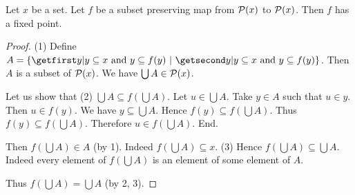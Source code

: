 \documentclass[../set-theory.tex]{subfiles}
\begin{document}
  \begin{forthel}
    \begin{theorem}
      Let $x$ be a set.
      Let $f$ be a subset preserving map from $\mathcal{P}(x)$ to $\mathcal{P}(x)$.
      Then $f$ has a fixed point.
    \end{theorem}
    \begin{proof}
      (1) Define $A = \class{y | \text{$y \subseteq x$ and
      $y \subseteq f(y)$}}$.
      Then $A$ is a subset of $\mathcal{P}(x)$.
      We have $\bigcup A \in \mathcal{P}(x)$.

      Let us show that (2) $\bigcup A \subseteq f(\bigcup A)$.
        Let $u \in \bigcup A$.
        Take $y \in A$ such that $u \in y$.
        Then $u \in f(y)$.
        We have $y \subseteq \bigcup A$.
        Hence $f(y) \subseteq f(\bigcup A)$.
        Thus $f(y) \subseteq f(\bigcup A)$.
        Therefore $u \in f(\bigcup A)$.
      End.

      Then $f(\bigcup A) \in A$ (by 1).
      Indeed $f(\bigcup A) \subseteq x$.
      (3) Hence $f(\bigcup A) \subseteq \bigcup A$.
      Indeed every element of $f(\bigcup A)$ is an element of some element of
      $A$.

      Thus $f(\bigcup A) = \bigcup A$ (by 2, 3).
    \end{proof}
  \end{forthel}
\end{document}
